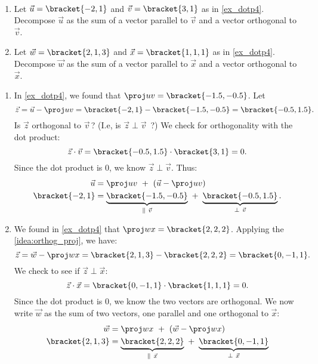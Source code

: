 \begin{example}\label{ex_dotp5}
\mbox{}\\[-2\baselineskip]\parbox[t]{\linewidth}{%
\begin{enumerate}
	\item Let $\vec u =\bracket{-2,1}$ and $\vec v =\bracket{3,1}$ as in \autoref{ex_dotp4}. Decompose $\vec u$ as the sum of a vector parallel to $\vec v$ and a vector orthogonal to $\vec v$.
	\item	Let $\vec w =\bracket{2,1,3}$ and $\vec x  =\bracket{1,1,1}$ as in \autoref{ex_dotp4}. Decompose $\vec w$ as the sum of a vector parallel to $\vec x$ and a vector orthogonal to $\vec x$.
\end{enumerate}}\vspace{0pt}
\solution
\begin{enumerate}
	\item In \autoref{ex_dotp4}, we found that $\proj uv =\bracket{-1.5,-0.5}$. Let
	\[\vec z = \vec u - \proj uv =\bracket{-2,1}-\bracket{-1.5,-0.5}=\bracket{-0.5, 1.5}.\]
	Is $\vec z$ orthogonal to $\vec v$\,? (I.e, is $\vec z \perp\vec v$\ ?) We check for orthogonality with the dot product:
	\[\vec z\cdot\vec v =\bracket{-0.5,1.5}\cdot\bracket{3,1}=0.\]
	Since the dot product is 0, we know $\vec z \perp \vec v$. Thus:
	\begin{align*}
	\vec u &= \proj uv\ +\ (\vec u - \proj uv) \\
	\bracket{-2,1}&= \underbrace{\bracket{-1.5,-0.5}}_{\parallel\ \vec v}\ +\ \underbrace{\bracket{-0.5,1.5}}_{\perp \ \vec v}.
	\end{align*}
	
	\item	We found in \autoref{ex_dotp4} that $\proj wx =\bracket{2,2,2}$. Applying the \autoref{idea:orthog_proj}, we have:
	\[\vec z = \vec w - \proj wx =\bracket{2,1,3}-\bracket{2,2,2}=\bracket{0,-1,1}.\] We check to see if $\vec z \perp \vec x$:
	\[\vec z\cdot\vec x =\bracket{0,-1,1}\cdot\bracket{1,1,1}= 0.\]
	Since the dot product is 0, we know the two vectors are orthogonal.
	We now write $\vec w$ as the sum of two vectors, one parallel and one orthogonal to $\vec x$:
	\begin{align*}
	\vec w &= \proj wx\ +\ (\vec w - \proj wx) \\
	\bracket{2,1,3}&= \underbrace{\bracket{2,2,2}}_{\parallel\ \vec x}\ +\ \underbrace{\bracket{0,-1,1}}_{\perp \ \vec x}
	\end{align*}
\end{enumerate}
\end{example}

